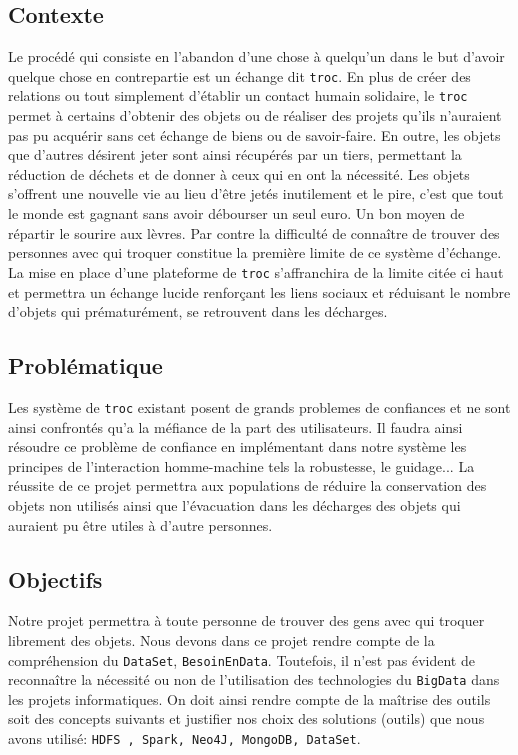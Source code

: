 \documentclass[12pt]{report}
\begin{document}
		\subsection{ \sc Contexte}
		Le procédé qui consiste en l’abandon d’une chose  à quelqu’un dans le but d’avoir quelque chose en contrepartie est un échange dit \texttt{troc}.
		En plus de créer des relations ou tout simplement d'établir un contact humain solidaire, le \texttt{troc} permet à certains d'obtenir des objets ou de réaliser des projets qu'ils n'auraient pas pu acquérir sans cet échange de biens ou de savoir-faire. En outre, les objets que d'autres désirent jeter sont ainsi récupérés par un tiers, permettant la réduction de déchets et de donner à ceux qui en ont la nécessité. Les objets s'offrent une nouvelle vie au lieu d'être jetés inutilement et le pire, c'est que tout le monde est gagnant sans avoir débourser un seul euro. Un bon moyen de répartir le sourire aux lèvres. Par contre la difficulté de connaître de trouver des personnes avec qui troquer constitue la première limite de ce système d'échange. La  mise en place d'une plateforme de {\tt troc} s'affranchira de la limite citée ci haut et permettra un échange lucide renforçant les liens sociaux et réduisant le nombre d'objets qui prématurément, se retrouvent dans les décharges.
	
		
	
		\subsection{ \sc Problématique}
		
		
		Les système de {\tt troc} existant posent de grands problemes de confiances et ne sont ainsi confrontés qu'a la méfiance de la part des utilisateurs. Il faudra ainsi résoudre ce problème de confiance en implémentant dans notre système les principes de l'interaction homme-machine tels la robustesse, le guidage... La réussite de ce projet permettra aux populations de réduire la conservation des objets non utilisés ainsi que l'évacuation dans les décharges des objets qui auraient pu être utiles à d'autre personnes. 
	
	
	

		\subsection{ \sc Objectifs}
		Notre projet permettra à toute personne de trouver des gens avec qui troquer librement des objets. Nous devons dans ce projet rendre compte de la compréhension du \texttt{DataSet}, \texttt{BesoinEnData}. Toutefois,
			il n'est pas évident de reconnaître la nécessité ou non de l'utilisation des technologies du \texttt{BigData} dans les projets informatiques. %
		 On doit ainsi rendre compte de la maîtrise des outils  soit des concepts suivants  et justifier nos choix des solutions (outils) que nous avons utilisé: \texttt{HDFS
		, Spark, Neo4J, MongoDB, DataSet}.
		
\end{document}
